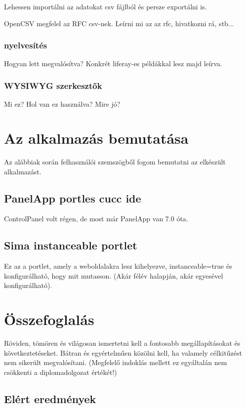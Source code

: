 \documentclass[hidelinks, 12pt, a4paper]{report}
\begin{document}
Lehessen importálni az adatokat csv fájlból és persze exportálni is.

OpenCSV megfelel az RFC csv-nek. Leírni mi az az rfc, hivatkozni rá, stb...

\subsection{nyelvesítés}

Hogyan lett megvalósítva? Konkrét liferay-es példákkal lesz majd leírva.

\subsection{WYSIWYG szerkesztők}

Mi ez? Hol van ez használva? Mire jó?

\chapter{Az alkalmazás bemutatása}

Az alábbiak során felhasználói szemszögből fogom bemutatni az elkészült alkalmazást.

\section{PanelApp portles cucc ide}

ControlPanel volt régen, de most már PanelApp van 7.0 óta.

\section{Sima instanceable portlet}

Ez az a portlet, amely a weboldalakra lesz kihelyezve, instanceable=true és konfigurálható, hogy mit mutasson. (Akár félév halapján, akár egyesével konfigurálható).

\chapter{Összefoglalás}

Röviden, tömören és világosan ismertetni kell a fontosabb megállapításokat és következtetéseket. Bátran és egyértelműen közölni kell, ha valamely célkitűzést nem sikerült megvalósítani. (Megfelelő indoklás mellett ez egyáltalán nem csökkenti a diplomadolgozat értékét!)

\section{Elért eredmények}
\end{document}
